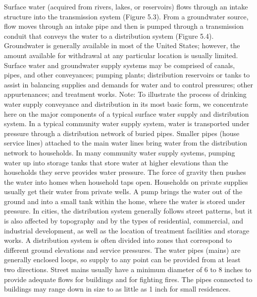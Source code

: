 \documentclass{article}
\begin{document}
Surface water (acquired from rivers, lakes, or reservoirs) flows through
an intake structure into the transmission system (Figure 5.3). From a
groundwater source, flow moves through an intake pipe and then is pumped
through a transmission conduit that conveys the water to a distribution
system (Figure 5.4). Groundwater is generally available in most of the
United States; however, the amount available for withdrawal at any
particular location is usually limited. Surface water and groundwater
supply systems may be comprised of canals, pipes, and other conveyances;
pumping plants; distribution reservoirs or tanks to assist in balancing
supplies and demands for water and to control pressures; other
appurtenances; and treatment works. Note: To illustrate the process of
drinking water supply conveyance and distribution in its most basic
form, we concentrate here on the major components of a typical surface
water supply and distribution system. In a typical community water
supply system, water is transported under pressure through a
distribution network of buried pipes. Smaller pipes (house service
lines) attached to the main water lines bring water from the
distribution network to households. In many community water supply
systems, pumping water up into storage tanks that store water at higher
elevations than the households they serve provides water pressure. The
force of gravity then pushes the water into homes when household taps
open. Households on private supplies usually get their water from
private wells. A pump brings the water out of the ground and into a
small tank within the home, where the water is stored under pressure. In
cities, the distribution system generally follows street patterns, but
it is also affected by topography and by the types of residential,
commercial, and industrial development, as well as the location of
treatment facilities and storage works. A distribution system is often
divided into zones that correspond to different ground elevations and
service pressures. The water pipes (mains) are generally enclosed loops,
so supply to any point can be provided from at least two directions.
Street mains usually have a minimum diameter of 6 to 8 inches to provide
adequate flows for buildings and for fighting fires. The pipes connected
to buildings may range down in size to as little as 1 inch for small
residences.
\end{document}
